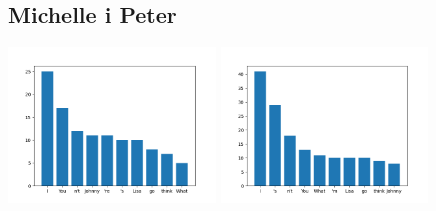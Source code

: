 \documentclass[a4paper,12pt]{article}
\begin{document}
	\subsection{Michelle i Peter}
	\begin{center}
		{\includegraphics[width=5.5cm]{michellesMostCommonWords.png}}
		{\includegraphics[width=5.5cm]{petersMostCommonWords.png}}\\
	\end{center}
\end{document}
